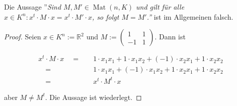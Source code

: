 \documentclass{article}
\newcommand{\RR}{\mathbb{R}}
\newcommand{\eq}{\mathbb{\quad = \quad}}
\DeclareMathOperator{\Mat}{Mat}
\begin{document}
\newpage

Die Aussage
''\textit{Sind $M, M' \in \Mat(n, K)$
und gilt für alle $x \in K^n : x^t \cdot M \cdot x = x^t \cdot M' \cdot x$,
so folgt $M = M'$.''}
ist im Allgemeinen falsch.

\begin{proof}
    Seien $x \in K^n := \RR^2$ und
    $
    M := \begin{pmatrix}
        1 & 1 \\ -1 & 1
    \end{pmatrix}.
    $
    Dann ist

    \[
    \begin{aligned}
        x^t \cdot M \cdot x
        \eq&
        1 \cdot x_1 x_1 +
        1 \cdot x_1 x_2 +
        (-1) \cdot x_2 x_1 +
        1 \cdot x_2 x_2\\
        \eq&
        1 \cdot x_1 x_1 +
        (-1) \cdot x_1 x_2 +
        1 \cdot x_2 x_1 +
        1 \cdot x_2 x_2 \\
        \eq&
        x^t \cdot M^t \cdot x
    \end{aligned}
    \]

    aber $M \neq M^t$. Die Aussage ist wiederlegt.
\end{proof}
\end{document}
